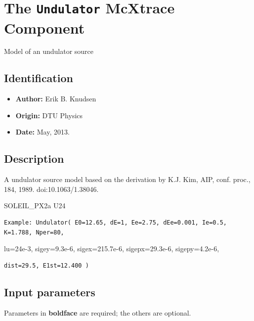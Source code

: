 \section{The \texttt{Undulator} McXtrace Component}
Model of an undulator source

\subsection*{Identification}
\begin{itemize}
  \item \textbf{Author:} Erik B. Knudsen
  \item \textbf{Origin:} DTU Physics
  \item \textbf{Date:} May, 2013.
\end{itemize}

\subsection*{Description}
A undulator source model based on the derivation by K.J. Kim, AIP, conf. proc., 184, 1989. doi:10.1063/1.38046.

SOLEIL\_PX2a U24

\begin{verbatim}
Example: Undulator( E0=12.65, dE=1, Ee=2.75, dEe=0.001, Ie=0.5, K=1.788, Nper=80,
\end{verbatim}

lu=24e-3, sigey=9.3e-6, sigex=215.7e-6, sigepx=29.3e-6, sigepy=4.2e-6,

\begin{verbatim}
dist=29.5, E1st=12.400 )
\end{verbatim}

\subsection*{Input parameters}
Parameters in \textbf{boldface} are required; the others are optional.

